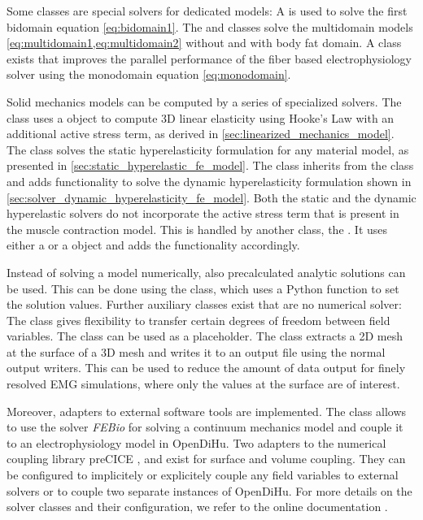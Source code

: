 Some classes are special solvers for dedicated models: A  is used to solve the first bidomain equation \cref{eq:bidomain1}. The  and  classes solve the multidomain models \cref{eq:multidomain1,eq:multidomain2} without and with body fat domain. A class  exists that improves the parallel performance of the fiber based electrophysiology solver using the monodomain equation \cref{eq:monodomain}.

Solid mechanics models can be computed by a series of specialized solvers. The  class uses a  object to compute 3D linear elasticity using Hooke's Law with an additional active stress term, as derived in \cref{sec:linearized_mechanics_model}. The  class solves the static hyperelasticity formulation for any material model, as presented in \cref{sec:static_hyperelastic_fe_model}. The  class inherits from the  class and adds functionality to solve the dynamic hyperelasticity formulation shown in \cref{sec:solver_dynamic_hyperelasticity_fe_model}. 
Both the static and the dynamic hyperelastic solvers do not incorporate the active stress term that is present in the muscle contraction model. This is handled by another class, the . It uses either a  or a  object and adds the functionality accordingly.

Instead of solving a model numerically, also precalculated analytic solutions can be used. This can be done using the  class, which uses a Python function to set the solution values. Further auxiliary classes exist that are no numerical solver: The  class gives flexibility to transfer certain degrees of freedom between field variables. The  class can be used as a placeholder. The  class extracts a 2D mesh at the surface of a 3D mesh and writes it to an output file using the normal output writers. This can be used to reduce the amount of data output for finely resolved EMG simulations, where only the values at the surface are of interest.

Moreover, adapters to external software tools are implemented. The class  allows to use the solver \emph{FEBio} \cite{Maas2012,maas2017febio} for solving a continuum mechanics model and couple it to an electrophysiology model in OpenDiHu.
Two adapters to the numerical coupling library preCICE \cite{precice},  and  exist for surface and volume coupling. They can be configured to implicitely or explicitely couple any field variables to external solvers or to couple two separate instances of OpenDiHu.
For more details on the solver classes and their configuration, we refer to the online documentation \cite{opendihuWeb}.

